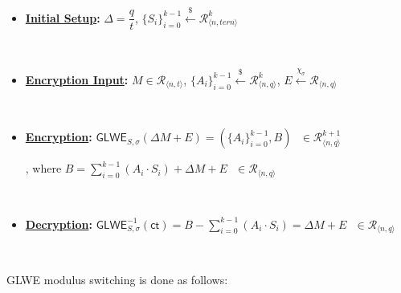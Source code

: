 \begin{itemize}
\item \textbf{\underline{Initial Setup}: } $\Delta = \dfrac{q}{t}$, \text{ } $\{S_i\}_{i=0}^{k-1} \xleftarrow{\$} \mathcal{R}_{\langle n, \textit{tern} \rangle}^k$

$ $

\item \textbf{\underline{Encryption Input}: } $M \in \mathcal{R}_{\langle n, t \rangle}$, \text{ } $\{A_i\}_{i=0}^{k-1} \xleftarrow{\$} \mathcal{R}_{\langle n,q \rangle}^{k}$, \text{ } $E \xleftarrow{\chi_\sigma} \mathcal{R}_{\langle n,q \rangle}$

$ $

\item \textbf{\underline{Encryption}: } $\textsf{GLWE}_{S,\sigma}(\Delta M + E) = (\{A_i\}_{i=0}^{k-1}, B) \text{ } \in \mathcal{R}_{\langle n,q \rangle}^{k + 1}$ 

, where $B = \sum\limits_{i=0}^{k-1}{(A_i \cdot S_i)} + \Delta  M + E \text{ } \in \mathcal{R}_{\langle n,q \rangle}$

$ $

\item \textbf{\underline{Decryption}: } $\textsf{GLWE}^{-1}_{S,\sigma}(\textsf{ct}) = B - \sum\limits_{i=0}^{k-1}{(A_i \cdot S_i)} = \Delta  M + E \text{ } \in \mathcal{R}_{\langle n,q \rangle}$

\end{itemize}

$ $

GLWE modulus switching is done as follows:

